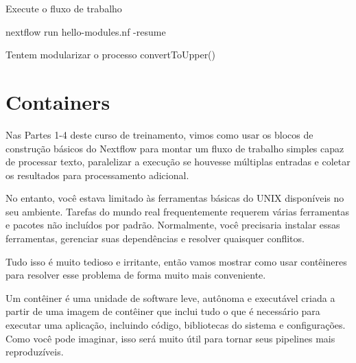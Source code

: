 \documentclass[
  brazilian,
  letterpaper,
  DIV=11,
  numbers=noendperiod]{scrreprt}
\newenvironment{Shaded}{\begin{snugshade}}{\end{snugshade}}
\newcommand{\NormalTok}[1]{\textcolor[rgb]{0.00,0.23,0.31}{#1}}
\newcommand{\OperatorTok}[1]{\textcolor[rgb]{0.37,0.37,0.37}{#1}}
\begin{document}
Execute o fluxo de trabalho

\begin{Shaded}
\begin{Highlighting}[]
\NormalTok{nextflow run hello}\OperatorTok{{-}}\NormalTok{modules}\OperatorTok{.}\NormalTok{nf }\OperatorTok{{-}}\NormalTok{resume }
\end{Highlighting}
\end{Shaded}

\begin{tcolorbox}[enhanced jigsaw, arc=.35mm, bottomrule=.15mm, bottomtitle=1mm, breakable, colback=white, colbacktitle=quarto-callout-note-color!10!white, colframe=quarto-callout-note-color-frame, coltitle=black, left=2mm, leftrule=.75mm, opacityback=0, opacitybacktitle=0.6, rightrule=.15mm, title=\textcolor{quarto-callout-note-color}{\faInfo}\hspace{0.5em}{Nota}, titlerule=0mm, toprule=.15mm, toptitle=1mm]

Tentem modularizar o processo convertToUpper()

\end{tcolorbox}

\section{Containers}\label{containers}

Nas Partes 1-4 deste curso de treinamento, vimos como usar os blocos de
construção básicos do Nextflow para montar um fluxo de trabalho simples
capaz de processar texto, paralelizar a execução se houvesse múltiplas
entradas e coletar os resultados para processamento adicional.

No entanto, você estava limitado às ferramentas básicas do UNIX
disponíveis no seu ambiente. Tarefas do mundo real frequentemente
requerem várias ferramentas e pacotes não incluídos por padrão.
Normalmente, você precisaria instalar essas ferramentas, gerenciar suas
dependências e resolver quaisquer conflitos.

Tudo isso é muito tedioso e irritante, então vamos mostrar como usar
contêineres para resolver esse problema de forma muito mais conveniente.

Um contêiner é uma unidade de software leve, autônoma e executável
criada a partir de uma imagem de contêiner que inclui tudo o que é
necessário para executar uma aplicação, incluindo código, bibliotecas do
sistema e configurações. Como você pode imaginar, isso será muito útil
para tornar seus pipelines mais reproduzíveis.
\end{document}
